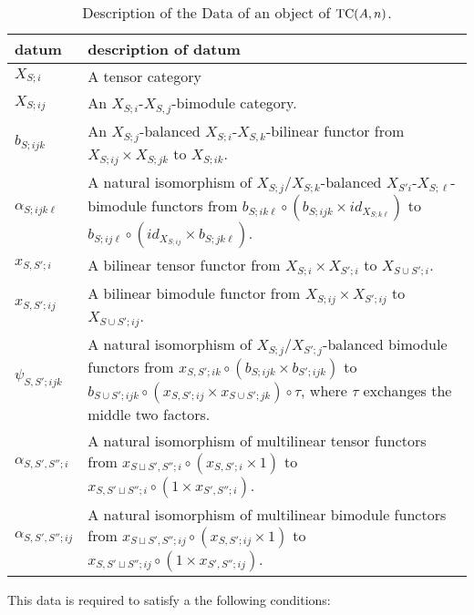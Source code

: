 \documentclass{amsart}
\begin{document}
\begin{table}[ht]
	\caption{Description of the Data of an object of $\mathrm{TC}(A,n)$.}	
	\begin{tabular}{l p{11cm}}
		datum & description of datum \\ \hline
		$X_{S;i}$ & A tensor category \\
		$X_{S;ij}$ & An $X_{S;i}$-$X_{S,j}$-bimodule category. \\
		$b_{S; ijk}$ & An $X_{S;j}$-balanced $X_{S;i}$-$X_{S,k}$-bilinear functor from $X_{S;ij}\times X_{S;jk}$ to $X_{S;ik}$. \\
		$\alpha_{S;ijk \ell}$  & A natural isomorphism of $X_{S;j}$/$X_{S;k}$-balanced $X_{S'i}$-$X_{S;\ell}$-bimodule functors from $b_{S;i k \ell} \circ (b_{S;ijk} \times id_{X_{S;k\ell}})$ to $b_{S;ij \ell} \circ (id_{X_{S;ij}} \times b_{S;jk\ell})$. \\ \hline
		$x_{S, S';i}$ & A bilinear tensor functor from $X_{S;i} \times X_{S';i}$ to $X_{S \cup S'; i}$. \\
		$x_{S, S';ij}$ & A bilinear bimodule functor from $X_{S;ij} \times X_{S';ij}$ to $X_{S \cup S'; ij}$. \\
		$\psi_{S, S'; i j k}$ & A natural isomorphism of $X_{S;j} / X_{S';j}$-balanced bimodule functors from $x_{S,S'; ik} \circ (b_{S; ijk} \times b_{S';ijk})$ to $b_{S \cup S'; ijk} \circ (x_{S,S';ij} \times x_{S \cup S'; jk}) \circ  \tau $, where $\tau$ exchanges the middle two factors.  \\ \hline
		$\alpha_{S, S', S'';i}$ & A natural isomorphism of multilinear tensor functors from
		$x_{S \sqcup S', S'';i}\circ (x_{S,S';i} \times 1)$  to 
		$x_{S, S' \sqcup S'';i} \circ (1 \times x_{S', S'';i})$. \\
		$\alpha_{S, S', S'';ij}$ & A natural isomorphism of multilinear bimodule functors from
		$x_{S \sqcup S', S'';ij}\circ (x_{S,S';ij} \times 1)$  to 
		$x_{S, S' \sqcup S'';ij} \circ (1 \times x_{S', S'';ij})$. \\
	\end{tabular}
	\label{Table:ObjectOfTC2}
\end{table}
This data is required to satisfy a the following conditions: \\
\end{document}
